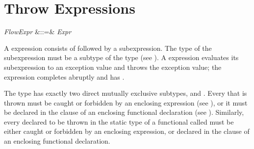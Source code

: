 %
%
%
%

\section{Throw Expressions}
\begin{Grammar}
\emph{FlowExpr} &::=&  \emph{Expr}
\end{Grammar}

A  expression consists of 
followed by a subexpression.
The type of the subexpression must be a subtype of the type
 (see ).
A  expression evaluates its subexpression to an exception value
and throws the exception value;
the expression completes abruptly and has .


The type  has exactly two direct mutually exclusive subtypes,
 and .
Every  that is thrown
must be caught or forbidden by an enclosing  expression
(see ),
or it must be declared in the  clause
of an enclosing functional declaration (see ).
Similarly, every  declared to be thrown
in the static type of a functional called
must be either caught or forbidden by an enclosing  expression,
or declared in the  clause
of an enclosing functional declaration.
